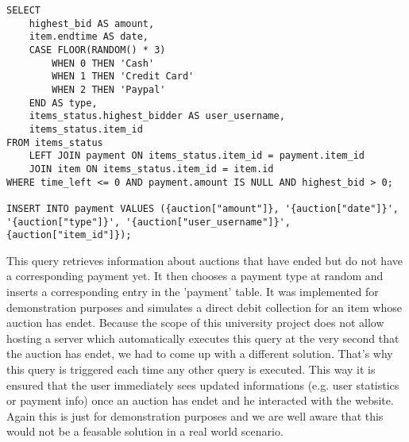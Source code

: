 \begin{lstlisting}[style=sqlStyle]
SELECT 
	highest_bid AS amount, 
	item.endtime AS date,
	CASE FLOOR(RANDOM() * 3)
		WHEN 0 THEN 'Cash'
		WHEN 1 THEN 'Credit Card'
		WHEN 2 THEN 'Paypal'
	END AS type,	
	items_status.highest_bidder AS user_username,
	items_status.item_id
FROM items_status
	LEFT JOIN payment ON items_status.item_id = payment.item_id
	JOIN item ON items_status.item_id = item.id
WHERE time_left <= 0 AND payment.amount IS NULL AND highest_bid > 0;

INSERT INTO payment VALUES ({auction["amount"]}, '{auction["date"]}', '{auction["type"]}', '{auction["user_username"]}', {auction["item_id"]});
\end{lstlisting}
This query retrieves information about auctions that have ended but do not have a corresponding payment yet. It then chooses a payment type at random and inserts a corresponding entry in the 'payment' table. It was implemented for demonstration purposes and simulates a direct debit collection for an item whose auction has endet. Because the scope of this university project does not allow hosting a server which automatically executes this query at the very second that the auction has endet, we had to come up with a different solution. That's why this query is triggered each time any other query is executed. This way it is ensured that the user immediately sees updated informations (e.g. user statistics or payment info) once an auction has endet and he interacted with the website. Again this is just for demonstration purposes and we are well aware that this would not be a feasable solution in a real world scenario.

